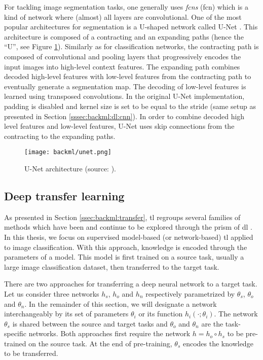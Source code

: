 For tackling image segmentation tasks, one generally uses \textit{\acrlong{fcn}s}
(\acrshort{fcn}) which is a kind of network where (almost) all layers are
convolutional. One of the most popular architectures for segmentation is a U-shaped
network called U-Net \cite{ronneberger2015unet}. This architecture is composed
of a contracting and an expanding paths (hence the ``U'', see Figure
\ref{fig:backml:unet}). Similarly as for classification networks, the contracting path is
composed of convolutional and pooling layers that progressively encodes the input
images into high-level context features. The expanding path combines decoded high-level
features with low-level features from the contracting path to eventually generate
a segmentation map. The decoding of low-level features is learned using
transposed convolutions. In the original U-Net implementation, padding is disabled and 
kernel size is set to be equal to the stride (same setup as presented in Section \ref{sssec:backml:dl:cnn}).
In order to combine decoded high level features and low-level
features, U-Net uses skip connections from the contracting to the expanding
paths.

\begin{figure}
  \centering
  \texttt{[image: backml/unet.png]}
  \caption{U-Net architecture (source: \cite{ronneberger2015unet}).}
  \label{fig:backml:unet}
\end{figure}

\subsection{Deep transfer learning}
\label{ssec:backml:dl:deeptransfer}

As presented in Section \ref{ssec:backml:transfer}, \acrlong{tl} regroups several
families of methods which have been and continue to be explored through the prism
of \acrlong{dl} \cite{tan2018survey}. In this thesis, we focus on supervised
model-based (or network-based) \acrlong{tl} applied to image classification. With
this approach, knowledge is encoded through the parameters of a model. This model
is first trained on a source task, usually a large image classification dataset,
then transferred to the target task.

There are two approaches for transferring a deep neural network to a target task.
Let us consider three networks $h_s$, $h_o$ and $h_n$ respectively parametrized
by $\theta_s$, $\theta_o$ and $\theta_n$. In the remainder of this section, we
will designate a network interchangeably by its set of parameters $\theta_i$ or
its function $h_i(\cdot;\theta_i)$. The network $\theta_s$ is shared between the
source and target tasks and $\theta_o$ and $\theta_n$ are the task-specific
networks. Both approaches first require the network $h = h_o \circ h_s$ to be
pre-trained on the source task. At the end of pre-training, $\theta_s$ encodes the knowledge
to be transferred.

